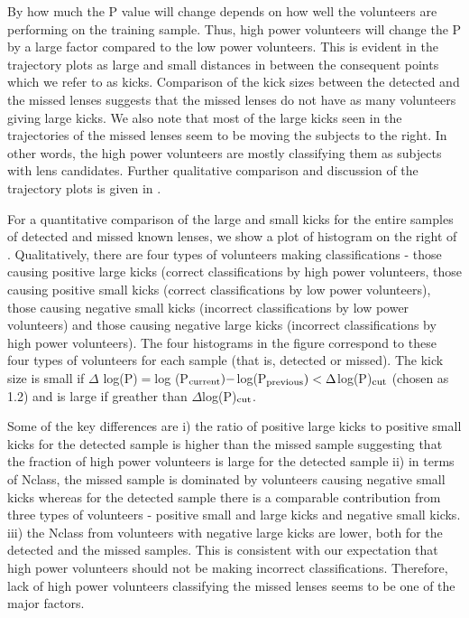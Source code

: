 \documentclass[useAMS,usenatbib,a4paper]{mn2e}
\begin{document}
By how much the P value will change depends on how well the
volunteers are performing on the training sample. Thus, high power
volunteers will change the P by a large factor compared to the low
power volunteers. This is evident in the trajectory plots as large and
small distances in between the consequent points which we refer to as
kicks. Comparison of the kick sizes between the detected
and the missed lenses suggests that the missed lenses do not have as
many volunteers giving large kicks. We also note that most of the large
kicks seen in the trajectories of the missed lenses seem to be moving
the subjects to the right. In other words, the high power volunteers
are mostly classifying them as subjects with lens candidates. Further
qualitative comparison and discussion of the trajectory plots is given
in .

For a quantitative comparison of the large and small kicks for the
entire samples of detected and missed known lenses, we show a plot of
histogram on the right of . Qualitatively, there are
four types of volunteers making classifications - those causing positive
large kicks (correct classifications by high power volunteers, those
causing positive small kicks (correct classifications by low power
volunteers), those causing negative small kicks (incorrect
classifications by low power volunteers) and those causing negative
large kicks (incorrect classifications by high power volunteers). The
four histograms in the figure correspond to these four types of
volunteers for each sample (that is, detected or missed). The kick size
is small if $\Delta$ log(P)$=$log (P$_{\rm current}) - $log(P$_{\rm
previous}) < \Delta$log(P)$_{\rm cut}$ (chosen as 1.2) and is large
if greather than $\Delta$log(P)$_{\rm cut}$.

Some of the key differences are i) the ratio of positive large kicks to
positive small kicks for the detected sample is higher than the missed
sample suggesting that the fraction of high power volunteers is large
for the detected sample ii) in terms of Nclass, the missed sample is
dominated by volunteers causing negative small kicks whereas for the
detected sample there is a comparable contribution from three types of
volunteers - positive small and large kicks and negative small kicks.
iii) the Nclass from volunteers with negative large kicks are lower, both
for the detected and the missed samples. This is consistent with our
expectation that high power volunteers should not be making incorrect
classifications. Therefore, lack of high power volunteers classifying
the missed lenses seems to be one of the major factors.
\end{document}
